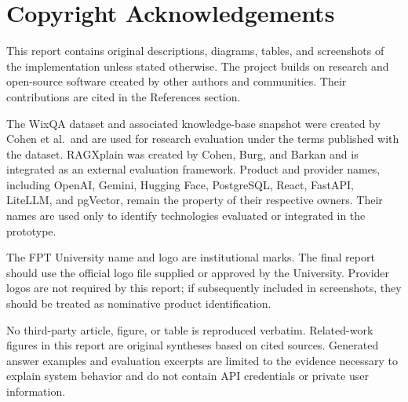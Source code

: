 \chapter*{Copyright Acknowledgements}

This report contains original descriptions, diagrams, tables, and screenshots
of the \SystemName{} implementation unless stated otherwise. The project builds
on research and open-source software created by other authors and communities.
Their contributions are cited in the References section.

The WixQA dataset and associated knowledge-base snapshot were created by Cohen
et al.\ and are used for research evaluation under the terms published with
the dataset. RAGXplain was created by Cohen, Burg, and Barkan and is integrated
as an external evaluation framework. Product and provider names, including
OpenAI, Gemini, Hugging Face, PostgreSQL, React, FastAPI, LiteLLM, and pgVector,
remain the property of their respective owners. Their names are used only to
identify technologies evaluated or integrated in the prototype.

The FPT University name and logo are institutional marks. The final report
should use the official logo file supplied or approved by the University.
Provider logos are not required by this report; if subsequently included in
screenshots, they should be treated as nominative product identification.

No third-party article, figure, or table is reproduced verbatim. Related-work
figures in this report are original syntheses based on cited sources. Generated
answer examples and evaluation excerpts are limited to the evidence necessary
to explain system behavior and do not contain API credentials or private user
information.
